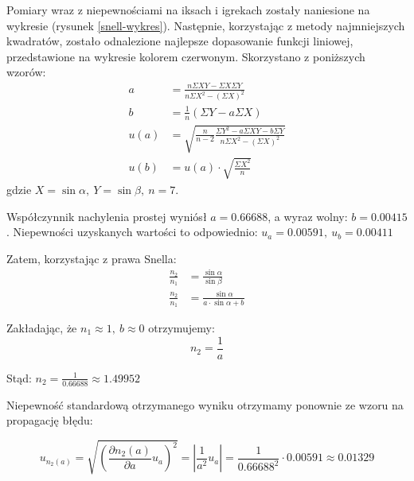 \documentclass[a4paper]{article}
\newlength{\du}
\begin{document}
Pomiary wraz z niepewnościami na iksach i igrekach zostały naniesione na wykresie (rysunek \ref{snell-wykres}).
Następnie, korzystając z metody najmniejszych kwadratów, zostało odnalezione najlepsze dopasowanie funkcji liniowej, przedstawione na wykresie kolorem czerwonym.
Skorzystano z poniższych wzorów:
\begin{align*}
a &= \frac{n \Sigma X Y - \Sigma X \Sigma Y}{n \Sigma X^2 - \left(\Sigma X\right)^2} \\
b &= \frac{1}{n}\left(\Sigma Y - a \Sigma X\right) \\
u(a) &= \sqrt{\frac{n}{n-2} \frac{\Sigma Y^2 - a\Sigma XY - b\Sigma Y}{n\Sigma X^2-\left(\Sigma X \right)^2}} \\
u(b) &= u(a)\cdot \sqrt{\frac{\Sigma X^2}{n}}
\end{align*}
gdzie $X = \sin\alpha, \ Y = \sin\beta, \ n = 7$.


Współczynnik nachylenia prostej wyniósł $a = 0.66688$, a wyraz wolny: $b = 0.00415$.
Niepewności uzyskanych wartości to odpowiednio:
$ u_a=0.00591, \ u_b=0.00411 $

Zatem, korzystając z prawa Snella:
\begin{align*}
\frac{n_2}{n_1} &= \frac{\sin\alpha}{\sin\beta} \\ 
\frac{n_2}{n_1} &= \frac{\sin\alpha}{a \cdot \sin\alpha + b}
\end{align*}

Zakładając, że $n_1 \approx 1, \ b \approx 0$ otrzymujemy:
\[ n_2 = \frac{1}{a}\]

Stąd: $n_2 = \frac{1}{0.66688} \approx 1.49952$

Niepewność standardową otrzymanego wyniku otrzymamy ponownie ze wzoru na propagację błędu:

\[
		u_{n_2(a)} = \sqrt{\left(\frac{\partial n_2(a)}{\partial a}u_{a}\right)^2} = 
		\left| \frac{1}{a^2} u_{a}\right| = \frac{1}{0.66688^2}\cdot 0.00591 \approx 0.01329
\]
\end{document}
